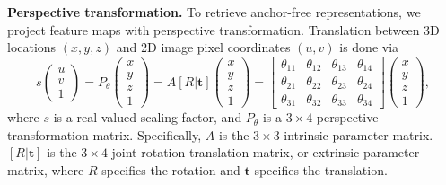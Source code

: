 \documentclass[runningheads]{llncs}
\begin{document}
\textbf{Perspective transformation.} 
To retrieve anchor-free representations, we project feature maps with perspective transformation. Translation between 3D locations $\left(x,y,z\right)$ and 2D image pixel coordinates $\left(u,v\right)$ is done via
\begin{equation}
\label{eq:perspective_3x4}
    s\left(\begin{matrix}u \\ v \\ 1\end{matrix}\right) = P_\theta \left(\begin{matrix} x \\ y \\ z \\ 1\end{matrix}\right) = A \left[R|\mathbf{t}\right] \left(\begin{matrix} x \\ y \\ z \\ 1\end{matrix}\right) = \left[\begin{matrix} \theta_{11} & \theta_{12} & \theta_{13} & \theta_{14} \\ \theta_{21} & \theta_{22} & \theta_{23} & \theta_{24} \\ \theta_{31} & \theta_{32} & \theta_{33} & \theta_{34} \end{matrix}\right] \left(\begin{matrix} x \\ y \\ z \\ 1\end{matrix}\right),
\end{equation}
where $s$ is a real-valued scaling factor, and $P_\theta$ is a $3\times4$ perspective transformation matrix. Specifically, $A$ is the $3\times3$ intrinsic parameter matrix. 
$\left[R|\textbf{t}\right]$ is the $3\times4$ joint rotation-translation matrix, or extrinsic parameter matrix, where $R$ specifies the rotation and $\mathbf{t}$ specifies the translation. 
\end{document}
